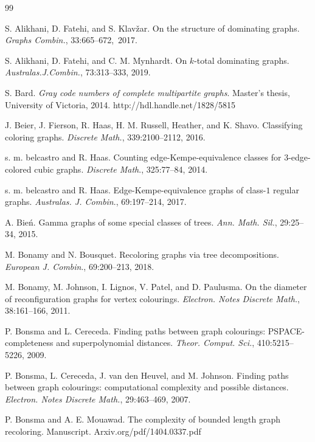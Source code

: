 \documentclass[12pt]{article}%
\begin{document}
\begin{thebibliography}{99}                                                                                               %


S. Alikhani, D. Fatehi, and S. Klav\v{z}ar. On the
structure of dominating graphs. \emph{Graphs Combin.}, 33:665--672,\ 2017.

S. Alikhani, D. Fatehi, and C. M. Mynhardt. On $k$-total
dominating graphs. \emph{Australas.J.Combin.}, 73:313--333, 2019.

S. Bard. \emph{Gray code numbers of complete multipartite
graphs}. Master's thesis, University of Victoria, 2014. http://hdl.handle.net/1828/5815

J. Beier, J. Fierson, R. Haas, H. M. Russell, Heather,
and K. Shavo. Classifying coloring graphs.\emph{ Discrete Math.},
339:2100--2112, 2016.

s. m. belcastro and R. Haas. Counting
edge-Kempe-equivalence classes for $3$-edge-colored cubic graphs.
\emph{Discrete Math}., 325:77--84, 2014.

s. m. belcastro and R. Haas.
Edge-Kempe-equivalence graphs of class-$1$ regular graphs. \emph{Australas. J.
Combin}., 69:197--214, 2017.

A. Bie\'{n}. Gamma graphs of some special classes of
trees. \emph{Ann. Math. Sil.}, 29:25--34, 2015.

M. Bonamy and N. Bousquet. Recoloring graphs via tree
decompositions. \emph{European J. Combin}., 69:200--213, 2018.

M. Bonamy, M. Johnson, I. Lignos, V. Patel, and D.
Paulusma. On the diameter of reconfiguration graphs for vertex colourings.
\emph{Electron. Notes Discrete Math.}, 38:161--166, 2011.

P. Bonsma and L. Cereceda. Finding paths between graph
colourings: PSPACE-completeness and superpolynomial distances. \emph{Theor.
Comput. Sci.}, 410:5215--5226,\textbf{ }2009.

P. Bonsma, L. Cereceda, J. van den Heuvel, and M. Johnson.
Finding paths between graph colourings: computational complexity and possible
distances. \emph{Electron. Notes Discrete Math.}, 29:463--469, 2007.

P. Bonsma and A. E. Mouawad. The complexity of bounded
length graph recoloring. Manuscript. Arxiv.org/pdf/1404.0337.pdf


\end{thebibliography}
\end{document}
